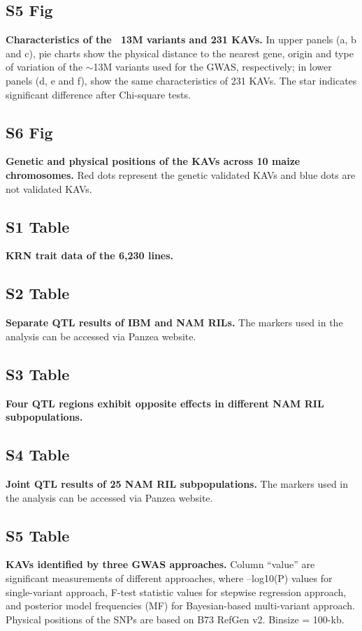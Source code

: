 \documentclass[10pt,letterpaper]{article}
\begin{document}
\subsection*{S5 Fig}
\label{Fig_S5}
{\bf Characteristics of the ~13M variants and 231 KAVs. } In upper panels (a, b and c), pie charts show the physical distance to the nearest gene, origin and type of variation of the $\sim$13M variants used for the GWAS, respectively; in lower panels (d, e and f), show the same characteristics of 231 KAVs. The star indicates significant difference after Chi-square tests.

\subsection*{S6 Fig}
\label{Fig_S6}
{\bf Genetic and physical positions of the KAVs across 10 maize chromosomes.} Red dots represent the genetic validated KAVs and blue dots are not validated KAVs.

\subsection*{S1 Table}
\label{Table_S1}
{\bf KRN trait data of the 6,230 lines.}

\subsection*{S2 Table}
\label{Table_S2}
{\bf Separate QTL results of IBM and NAM RILs.} The markers used in the analysis can be accessed via Panzea website.


\subsection*{S3 Table}
\label{Table_S3}
{\bf Four QTL regions exhibit opposite effects in different NAM RIL subpopulations.}

\subsection*{S4 Table}
\label{Table_S4}
{\bf Joint QTL results of 25 NAM RIL subpopulations.} The markers used in the analysis can be accessed via Panzea website.

\subsection*{S5 Table}
\label{Table_S5}
{\bf KAVs identified by three GWAS approaches.} Column “value” are significant measurements of different approaches, where –log10(P) values for single-variant approach, F-test statistic values for stepwise regression approach, and posterior model frequencies (MF) for Bayesian-based multi-variant approach. Physical positions of the SNPs are based on B73 RefGen v2. Binsize  = 100-kb.
\end{document}
